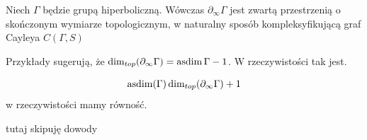   Niech $\Gamma$ będzie grupą hiperboliczną. Wówczas $\partial_\infty \Gamma$ jest zwartą przestrzenią o skończonym wymiarze topologicznym, w naturalny sposób kompleksyfikującą graf Cayleya $C(\Gamma,S)$

Przykłady sugerują, że $\dim_{top}(\partial_\infty\Gamma)=\operatorname{asdim}\Gamma-1$. W rzeczywistości tak jest.

\begin{theorem}{}{}
  $$\operatorname{asdim}(\Gamma)\dim_{top}(\partial_\infty \Gamma)+1$$
  w rzeczywistości mamy równość.
\end{theorem}

{\color{red} tutaj skipuję dowody}




